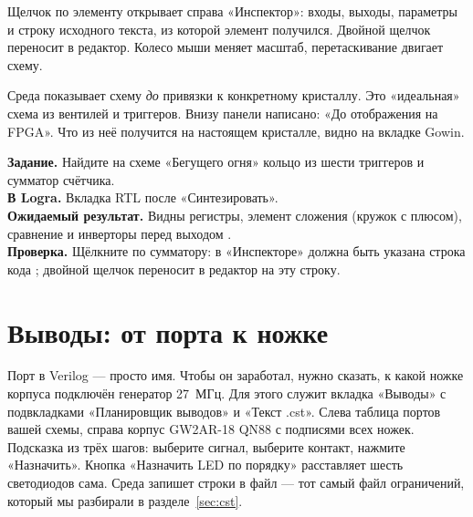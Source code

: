 
Щелчок по элементу открывает справа «Инспектор»: входы, выходы, параметры и
строку исходного текста, из которой элемент получился. Двойной щелчок
переносит в редактор. Колесо мыши меняет масштаб, перетаскивание двигает схему.

\begin{ideabox}
Среда показывает схему \emph{до} привязки к конкретному кристаллу. Это
«идеальная» схема из вентилей и триггеров. Внизу панели написано: «До
отображения на FPGA». Что из неё получится на настоящем кристалле, видно на
вкладке Gowin.
\end{ideabox}

\begin{diybox}
\textbf{Задание.} Найдите на схеме «Бегущего огня» кольцо из шести триггеров и
сумматор счётчика.\\
\textbf{В Logra.} Вкладка RTL после «Синтезировать».\\
\textbf{Ожидаемый результат.} Видны регистры, элемент сложения (кружок с
плюсом), сравнение  и инверторы перед выходом .\\
\textbf{Проверка.} Щёлкните по сумматору: в «Инспекторе» должна быть указана
строка кода ; двойной щелчок переносит в редактор на эту строку.
\end{diybox}

\section{Выводы: от порта к ножке}

Порт  в Verilog --- просто имя. Чтобы он заработал, нужно сказать,
к какой ножке корпуса подключён генератор 27~МГц. Для этого служит вкладка
«Выводы» с подвкладками «Планировщик выводов» и «Текст .cst». Слева таблица
портов вашей схемы, справа корпус GW2AR-18 QN88 с подписями всех ножек. Подсказка
из трёх шагов: выберите сигнал, выберите контакт, нажмите «Назначить».
Кнопка «Назначить LED по порядку» расставляет шесть светодиодов сама. Среда
запишет строки  в файл  --- тот самый файл
ограничений, который мы разбирали в разделе~\ref{sec:cst}.


